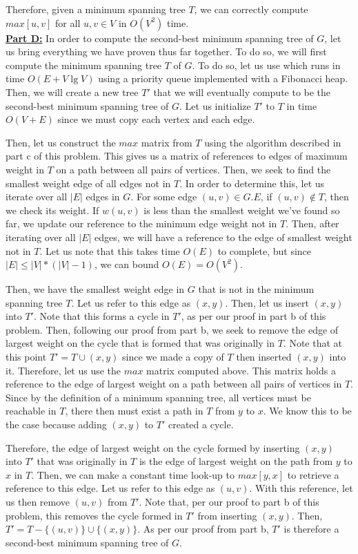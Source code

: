 \documentclass[11pt]{article}
\begin{document}
Therefore, given a minimum spanning tree $T$, we can correctly compute $max[u,v]$ for all $u,v \in V$ in $O(V^2)$ time.\\

\underline{\textbf{Part D:}} In order to compute the second-best minimum spanning tree of $G$, let us bring everything we have proven thus far together. To do so, we will first compute the minimum spanning tree $T$ of $G$. To do so, let us use  which runs in time $O(E + V\lg{V})$ using a priority queue implemented with a Fibonacci heap. Then, we will create a new tree $T'$ that we will eventually compute to be the second-best minimum spanning tree of $G$. Let us initialize $T'$ to $T$ in time $O(V + E)$ since we must copy each vertex and each edge.

Then, let us construct the $max$ matrix from $T$ using the algorithm described in part c of this problem. This gives us a matrix of references to edges of maximum weight in $T$ on a path between all pairs of vertices. Then, we seek to find the smallest weight edge of all edges not in $T$. In order to determine this, let us iterate over all $|E|$ edges in $G$. For some edge $(u,v) \in G.E$, if $(u,v) \notin T$, then we check its weight. If $w(u,v)$ is less than the smallest weight we've found so far, we update our reference to the minimum edge weight not in $T$. Then, after iterating over all $|E|$ edges, we will have a reference to the edge of smallest weight not in $T$. Let us note that this takes time $O(E)$ to complete, but since $|E| \leq |V|*(|V|-1)$, we can bound $O(E) = O(V^2)$.

Then, we have the smallest weight edge in $G$ that is not in the minimum spanning tree $T$. Let us refer to this edge as $(x,y)$. Then, let us insert $(x,y)$ into $T'$. Note that this forms a cycle in $T'$, as per our proof in part b of this problem. Then, following our proof from part b, we seek to remove the edge of largest weight on the cycle that is formed that was originally in $T$. Note that at this point $T' = T \cup (x,y)$ since we made a copy of $T$ then inserted $(x,y)$ into it. Therefore, let us use the $max$ matrix computed above. This matrix holds a reference to the edge of largest weight on a path between all pairs of vertices in $T$. Since by the definition of a minimum spanning tree, all vertices must be reachable in $T$, there then must exist a path in $T$ from $y$ to $x$. We know this to be the case because adding $(x,y)$ to $T'$ created a cycle.

Therefore, the edge of largest weight on the cycle formed by inserting $(x,y)$ into $T'$ that was originally in $T$ is the edge of largest weight on the path from $y$ to $x$ in $T$. Then, we can make a constant time look-up to $max[y,x]$ to retrieve a reference to this edge. Let us refer to this edge as $(u,v)$. With this reference, let us then remove $(u,v)$ from $T'$. Note that, per our proof to part b of this problem, this removes the cycle formed in $T'$ from inserting $(x,y)$. Then, $T' = T - \{(u,v)\} \cup \{(x,y)\}$. As per our proof from part b, $T'$ is therefore a second-best minimum spanning tree of $G$.
\end{document}
